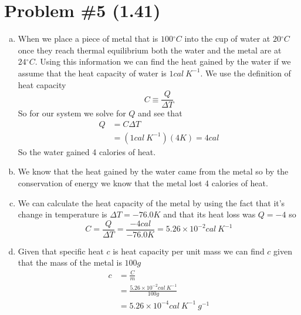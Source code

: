 \documentclass[11pt]{article}
\numberwithin{equation}{section}
\begin{document}
\section{Problem \#5 (1.41)}
\begin{enumerate}[(a)]
\item
When we place a piece of metal that is $100\unit{^\circ C}$ into the cup of water at $20\unit{^\circ C}$ once they reach thermal equilibrium both the water and the metal are at $24\unit{^\circ C}$. Using this information we can find the heat gained by the water if we assume that the heat capacity of water is $1\unit{cal\ K^{-1}}$. We use the definition of heat capacity
$$C\equiv \frac{Q}{\Delta T}$$
So for our system we solve for $Q$ and see that
\begin{align*}
Q &= C\Delta T\\
&= (1\unit{cal\ K^{-1}})(4\unit{K}) = 4\unit{cal}
\end{align*}
So the water gained 4 calories of heat.

\item
We know that the heat gained by the water came from the metal so by the conservation of energy we know that the metal lost 4 calories of heat.

\item
We can calculate the heat capacity of the metal by using the fact that it's change in temperature is $\Delta T = -76.0\unit{K}$ and that its heat loss was $Q=-4$ so
$$C = \frac{Q}{\Delta T} = \frac{-4\unit{cal}}{-76.0\unit{K}} = 5.26\times10^{-2}\unit{cal\ K^{-1}}$$

\item
Given that specific heat $c$ is heat capacity per unit mass we can find $c$ given that the mass of the metal is $100\unit{g}$
\begin{align*}
c &= \frac{C}{m}\\
&= \frac{5.26\times10^{-2}\unit{cal\ K^{-1}}}{100\unit{g}}\\
&= 5.26\times10^{-4}\unit{cal\ K^{-1}\ g^{-1}}
\end{align*}
\end{enumerate}
\end{document}
